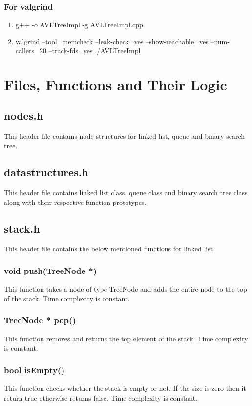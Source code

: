 \documentclass{article}
\begin{document}
\subsubsection{For valgrind}
\begin{enumerate}
	\item g++ -o AVLTreeImpl -g AVLTreeImpl.cpp
	\item valgrind --tool=memcheck --leak-check=yes --show-reachable=yes --num-callers=20 --track-fds=yes ./AVLTreeImpl
\end{enumerate}

\section{Files, Functions and Their Logic}
\subsection{nodes.h}
This header file contains node structures for linked list, queue and binary search tree.

\subsection{datastructures.h}
This header file contains linked list class, queue class and binary search tree class along with their respective function prototypes.

\subsection{stack.h}
This header file contains the below mentioned functions for linked list.

\subsubsection{void push(TreeNode *)}
This function takes a node of type TreeNode and adds the entire node to the top of the stack. Time complexity is constant.

\subsubsection{TreeNode * pop()}
This function removes and returns the top element of the stack. Time complexity is constant.

\subsubsection{bool isEmpty()}
This function checks whether the stack is empty or not. If the size is zero then it return true otherwise returns false. Time complexity is constant.
\end{document}

